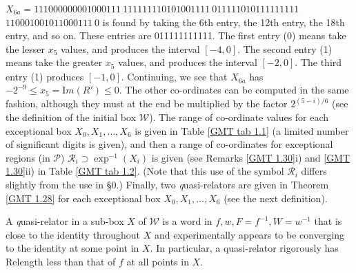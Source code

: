 \begin{remark}
\noindent 
$X_{6a} = 
111000000001000111\ 
111111110101001111\ 
011111010111111111$\hfill
{}
  \hfill $  
110001001011000111\ 0$
\vglue4pt\noindent 
is found by taking the 6th entry, the 12th entry, the 18th entry, and so on.  These entries are 011111111111.  The first entry (0) means take the
lesser $x_5$ values, and produces the interval $[-4,0].$  The second entry (1) means take the greater $x_5$ values, and produces the interval
$[-2,0].$  The third entry (1) produces $[-1,0].$  Continuing, we see that $X_{6a}^{\phantom{|}}$ has $-2^{-9} \le x_5 = {\mathrm Im}(R') \le 0.$  The other
co-ordinates can be computed in the same fashion, although they must at the end be multiplied by the factor $2^{(5 - i)/6}$ (see the definition of the
initial box
${\mathcal W}$).  The range of co-ordinate values for each  exceptional  box $X_0, X_1, \ldots, X_6$ is given in Table \ref{GMT tab 1.1} (a limited number of significant
digits is given), and  then a range of co-ordinates for exceptional regions (in ${\mathcal P}$) 
${\mathcal R}_i \supset \exp^{-1}(X_i)$ is given (see
Remarks \ref{GMT 1.30}i) and \ref{GMT 1.30}ii)
in Table \ref{GMT tab 1.2}. (Note that this use of the symbol ${\mathcal R}_i$ differs
slightly from the use in \S 0.)
Finally, two {\textit quasi-relators} are given in Theorem \ref{GMT 1.28} for each exceptional box $X_0, X_1, \ldots, X_6$ (see the next definition).\end{remark}
 
\begin{definition} \label{GMT 1.27} A {\textit quasi-relator} in a sub-box $X$ of ${\mathcal W}$ is a word in $f,w,F=f^{-1},W=w^{-1}$ that is close to the identity
throughout
$X$ and experimentally appears to be converging to the identity at some point in $X.$  In particular, a quasi-relator rigorously has Relength less than
that of $f$ at all points in $X.$
\end{definition}

